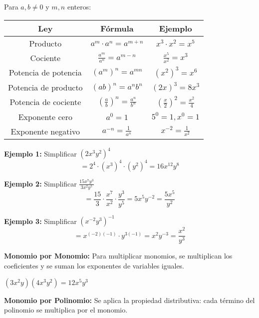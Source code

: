 \begin{theorem}
Para $a, b \neq 0$ y $m, n$ enteros:

\begin{center}
\begin{tabular}{|c|c|c|}
\hline
\textbf{Ley} & \textbf{Fórmula} & \textbf{Ejemplo} \\
\hline
Producto & $a^m \cdot a^n = a^{m+n}$ & $x^3 \cdot x^2 = x^5$ \\
\hline
Cociente & $\frac{a^m}{a^n} = a^{m-n}$ & $\frac{x^5}{x^2} = x^3$ \\
\hline
Potencia de potencia & $(a^m)^n = a^{mn}$ & $(x^2)^3 = x^6$ \\
\hline
Potencia de producto & $(ab)^n = a^n b^n$ & $(2x)^3 = 8x^3$ \\
\hline
Potencia de cociente & $\left(\frac{a}{b}\right)^n = \frac{a^n}{b^n}$ & $\left(\frac{x}{2}\right)^2 = \frac{x^2}{4}$ \\
\hline
Exponente cero & $a^0 = 1$ & $5^0 = 1, x^0 = 1$ \\
\hline
Exponente negativo & $a^{-n} = \frac{1}{a^n}$ & $x^{-2} = \frac{1}{x^2}$ \\
\hline
\end{tabular}
\end{center}
\end{theorem}

\begin{example}
\textbf{Ejemplo 1:} Simplificar $(2x^3y^2)^4$
$$= 2^4 \cdot (x^3)^4 \cdot (y^2)^4 = 16x^{12}y^8$$

\textbf{Ejemplo 2:} Simplificar $\frac{15x^7y^3}{3x^2y^5}$
$$= \frac{15}{3} \cdot \frac{x^7}{x^2} \cdot \frac{y^3}{y^5} = 5x^5y^{-2} = \frac{5x^5}{y^2}$$

\textbf{Ejemplo 3:} Simplificar $(x^{-2}y^3)^{-1}$
$$= x^{(-2)(-1)} \cdot y^{3(-1)} = x^2y^{-3} = \frac{x^2}{y^3}$$
\end{example}


\textbf{Monomio por Monomio:}
Para multiplicar monomios, se multiplican los coeficientes y se suman los exponentes de variables iguales.

\begin{example}
$(3x^2y)(4x^3y^2) = 12x^5y^3$
\end{example}

\textbf{Monomio por Polinomio:}
Se aplica la propiedad distributiva: cada término del polinomio se multiplica por el monomio.

